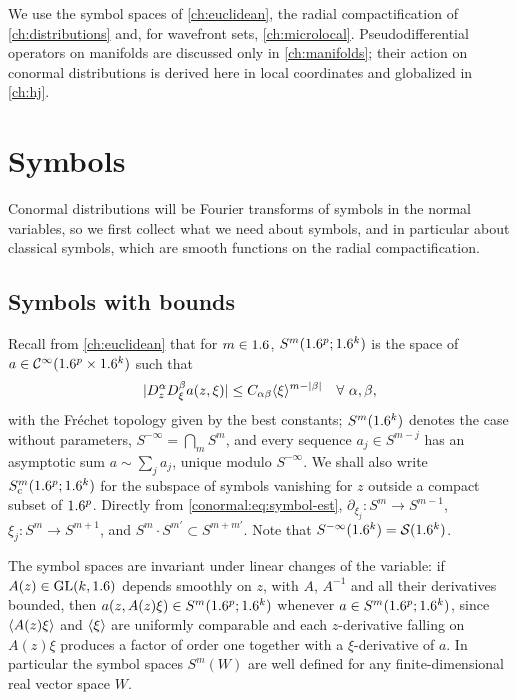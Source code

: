 We use the symbol spaces of \cref{ch:euclidean}, the radial compactification
of \cref{ch:distributions} and, for wavefront sets, \cref{ch:microlocal}.
Pseudodifferential operators on manifolds are discussed only in
\cref{ch:manifolds}; their action on conormal distributions is derived here in
local coordinates and globalized in \cref{ch:hj}.

\section{Symbols}\label{conormal:sec:symbols}

Conormal distributions will be Fourier transforms of symbols in the normal
variables, so we first collect what we need about symbols, and in particular
about classical symbols, which are smooth functions on the radial
compactification.

\subsection{Symbols with bounds}
Recall from \cref{ch:euclidean} that for $m\in1.6$, $S^m(1.6^p;1.6^k)$ is the
space of $a\in\mathcal{C}^\infty(1.6^p\times1.6^k)$ such that
\begin{equation}\label{conormal:eq:symbol-est}
  |D_z^\alpha D_\xi^\beta a(z,\xi)|\le C_{\alpha\beta}\langle \xi\rangle^{m-|\beta|}
  \quad\forall\ \alpha,\beta,
\end{equation}
with the Fr\'echet topology given by the best constants; $S^m(1.6^k)$ denotes the
case without parameters, $S^{-\infty}=\bigcap_m S^m$, and every sequence
$a_j\in S^{m-j}$ has an asymptotic sum $a\sim\sum_j a_j$, unique modulo
$S^{-\infty}$.  We shall also write $S^m_{\mathrm c}(1.6^p;1.6^k)$ for the
subspace of symbols vanishing for $z$ outside a compact subset of $1.6^p$.
Directly from \eqref{conormal:eq:symbol-est}, $\partial_{\xi_j}:S^m\to S^{m-1}$, $\xi_j:S^m\to S^{m+1}$, and
$S^m\cdot S^{m'}\subset S^{m+m'}$.  Note that $S^{-\infty}(1.6^k)=\mathcal{S}(1.6^k)$.

The symbol spaces are invariant under linear changes of the variable: if
$A(z)\in\operatorname{GL}(k,1.6)$ depends smoothly on $z$, with $A$, $A^{-1}$ and all their
derivatives bounded, then $a(z,A(z)\xi)\in S^m(1.6^p;1.6^k)$ whenever
$a\in S^m(1.6^p;1.6^k)$, since $\langle A(z)\xi\rangle$ and $\langle \xi\rangle$ are uniformly
comparable and each $z$-derivative falling on $A(z)\xi$ produces a factor of
order one together with a $\xi$-derivative of $a$.  In particular the symbol
spaces $S^m(W)$ are well defined for any finite-dimensional real vector space
$W$.

